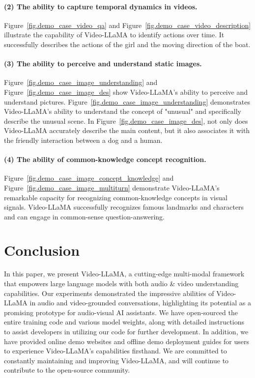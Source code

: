 \documentclass[11pt]{article}
\begin{document}
\paragraph{(2) The ability to capture temporal dynamics in videos.} 
Figure~\ref{fig.demo_case_video_qa} and Figure~\ref{fig.demo_case_video_description} illustrate the capability of Video-LLaMA to identify actions over time. 
It successfully describes the actions of the girl and the moving direction of the boat.

\paragraph{(3) The ability to perceive and understand static images.} Figure~\ref{fig.demo_case_image_understanding} and Figure~\ref{fig.demo_case_image_des}  show Video-LLaMA's ability to perceive and understand pictures. Figure~\ref{fig.demo_case_image_understanding} demonstrates Video-LLaMA's ability to understand the concept of "unusual" and specifically describe the unusual scene.  In Figure~\ref{fig.demo_case_image_des}, not only does Video-LLaMA accurately describe the main content, but it also associates it with the friendly interaction between a dog and a human.

\paragraph{(4) The ability of common-knowledge concept recognition.} Figure~\ref{fig.demo_case_image_concept_knowledge} and Figure~\ref{fig.demo_case_image_multiturn} demonstrate Video-LLaMA's remarkable capacity for recognizing common-knowledge concepts in visual signals. Video-LLaMA successfully recognizes famous landmarks and characters and can engage in common-sense question-answering.



\section{Conclusion}
In this paper, we present Video-LLaMA, a cutting-edge multi-modal framework that empowers large language models with both audio \& video understanding capabilities. Our experiments  demonstrated the impressive abilities of Video-LLaMA in audio and video-grounded conversations, highlighting its potential as a promising prototype for audio-visual AI assistants. We have open-sourced the entire training code and various model weights, along with detailed instructions to assist developers in utilizing our code for further development. In addition, we have provided online demo websites and offline demo deployment guides for users to experience Video-LLaMA's capabilities firsthand. We are committed to constantly maintaining and improving Video-LLaMA, and will continue to contribute to the open-source community.
\end{document}
